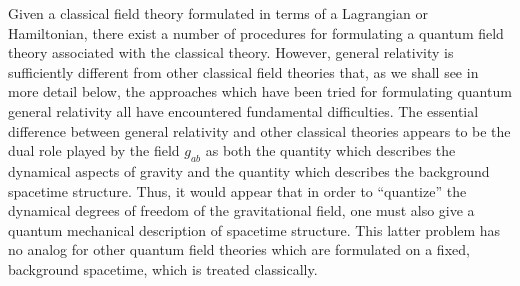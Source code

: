 Given a classical field theory formulated in terms of a Lagrangian or Hamiltonian,
there exist a number of procedures for formulating a quantum field theory associated
with the classical theory. However, general relativity is sufficiently different from
other classical field theories that, as we shall see in more detail below, the approaches
which have been tried for formulating quantum general relativity all have encountered
fundamental difficulties. The essential difference between general relativity
and other classical theories appears to be the dual role played by the field \(g_{ab}\) as both
the quantity which describes the dynamical aspects of gravity and the quantity which
describes the background spacetime structure. Thus, it would appear that in order to
``quantize'' the dynamical degrees of freedom of the gravitational field, one must also
give a quantum mechanical description of spacetime structure. This latter problem
has no analog for other quantum field theories which are formulated on a fixed,
background spacetime, which is treated classically.

